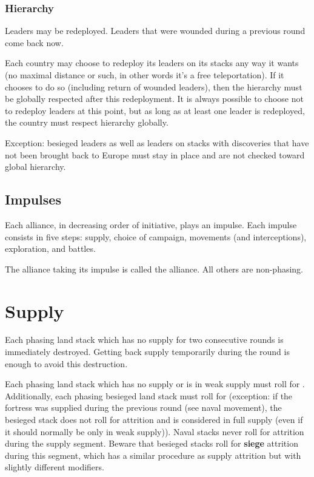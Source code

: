 \subsubsection{Hierarchy}
Leaders may be redeployed. Leaders that were wounded during a previous round
come back now.

Each country may choose to redeploy its leaders on its stacks any way it wants
(no maximal distance or such, in other words it's a free teleportation). If it
chooses to do so (including return of wounded leaders), then the hierarchy
must be globally respected after this redeployment. It is always possible to
choose not to redeploy leaders at this point, but as long as at least one
leader is redeployed, the country must respect hierarchy globally.

Exception: besieged leaders as well as leaders on stacks with discoveries that
have not been brought back to Europe must stay in place and are not checked
toward global hierarchy.

\subsection{Impulses}
Each alliance, in decreasing order of initiative, plays an impulse. Each
impulse consists in five steps: supply, choice of campaign, movements (and
interceptions), exploration, and battles.

The alliance taking its impulse is called the  alliance. All
others are non-phasing.


\section{Supply}
\label{chMilitary:Supply}
Each phasing land stack which has no supply for two consecutive rounds is
immediately destroyed. Getting back supply temporarily during the round is
enough to avoid this destruction.

Each phasing land stack which has no supply or is in weak supply must roll for
. Additionally, each phasing besieged land stack must
roll for  (exception: if the fortress was supplied
during the previous round (see naval movement), the besieged stack does not
roll for attrition and is considered in full supply (even if it should
normally be only in weak supply)). Naval stacks never roll for attrition
during the supply segment. Beware that besieged stacks roll for \textbf{siege}
attrition during this segment, which has a similar procedure as supply
attrition but with slightly different modifiers.

